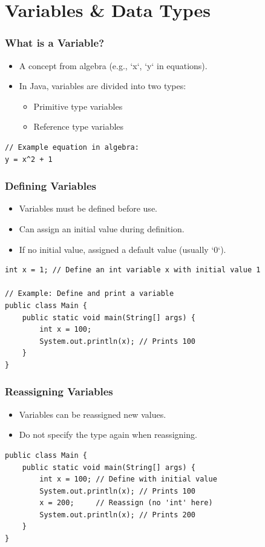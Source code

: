 \documentclass[serif, aspectratio=169]{beamer}
\begin{document}
\section{Variables \& Data Types}
\begin{frame}[fragile]
\frametitle{What is a Variable?}
\begin{itemize}
    \item A concept from algebra (e.g., `x`, `y` in equations).
    \item In Java, variables are divided into two types:
    \begin{itemize}
        \item Primitive type variables
        \item Reference type variables
    \end{itemize}
\end{itemize}
\begin{lstlisting}
// Example equation in algebra:
y = x^2 + 1
\end{lstlisting}
\end{frame}

\begin{frame}[fragile]
\frametitle{Defining Variables}
\begin{itemize}
    \item Variables must be defined before use.
    \item Can assign an initial value during definition.
    \item If no initial value, assigned a default value (usually `0`).
\end{itemize}
\begin{lstlisting}
int x = 1; // Define an int variable x with initial value 1

// Example: Define and print a variable
public class Main {
    public static void main(String[] args) {
        int x = 100;
        System.out.println(x); // Prints 100
    }
}
\end{lstlisting}
\end{frame}

\begin{frame}[fragile]
\frametitle{Reassigning Variables}
\begin{itemize}
    \item Variables can be reassigned new values.
    \item Do not specify the type again when reassigning.
\end{itemize}
\begin{lstlisting}
public class Main {
    public static void main(String[] args) {
        int x = 100; // Define with initial value
        System.out.println(x); // Prints 100
        x = 200;     // Reassign (no 'int' here)
        System.out.println(x); // Prints 200
    }
}
\end{lstlisting}
\end{frame}
\end{document}
